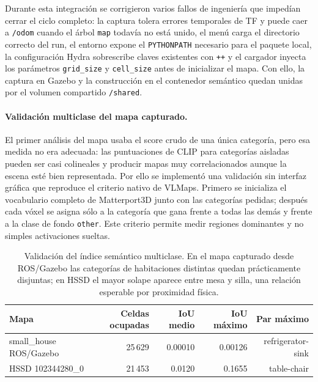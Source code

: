 \documentclass[11pt,fleqn,openany]{book} %
\begin{document}
Durante esta integración se corrigieron varios fallos de ingeniería que
impedían cerrar el ciclo completo: la captura tolera errores temporales de TF y
puede caer a \texttt{/odom} cuando el árbol \texttt{map} todavía no está unido,
el menú carga el directorio correcto del run, el entorno expone el
\texttt{PYTHONPATH} necesario para el paquete local, la configuración Hydra
sobrescribe claves existentes con \texttt{++} y el cargador inyecta los
parámetros \texttt{grid\_size} y \texttt{cell\_size} antes de inicializar el
mapa. Con ello, la captura en Gazebo y la construcción en el contenedor
semántico quedan unidas por el volumen compartido \texttt{/shared}.

\paragraph{Validación multiclase del mapa capturado.} El primer análisis del
mapa usaba el score crudo de una única categoría, pero esa medida no era
adecuada: las puntuaciones de CLIP para categorías aisladas pueden ser casi
colineales y producir mapas muy correlacionados aunque la escena esté bien
representada. Por ello se implementó una validación sin interfaz gráfica que reproduce el
criterio nativo de VLMaps. Primero se inicializa el vocabulario completo de
Matterport3D junto con las categorías pedidas; después cada vóxel se asigna sólo
a la categoría que gana frente a todas las demás y frente a la clase de fondo
\texttt{other}. Este criterio permite medir regiones dominantes y no simples
activaciones sueltas.

\begin{table}[H]
\centering
\begin{tabular}{lrrrr}
\toprule
Mapa & Celdas ocupadas & IoU medio & IoU máximo & Par máximo \\
\midrule
small\_house ROS/Gazebo & 25\,629 & 0.00010 & 0.00126 & refrigerator-sink \\
HSSD 102344280\_0 & 21\,453 & 0.0120 & 0.1655 & table-chair \\
\bottomrule
\end{tabular}
\caption[Validación del índice semántico multiclase.]{Validación del índice
semántico multiclase. En el mapa capturado desde ROS/Gazebo las categorías de
habitaciones distintas quedan prácticamente disjuntas; en HSSD el mayor solape
aparece entre mesa y silla, una relación esperable por proximidad física.}
\label{tab:vlmap_index_multiclase}
\end{table}
\end{document}
